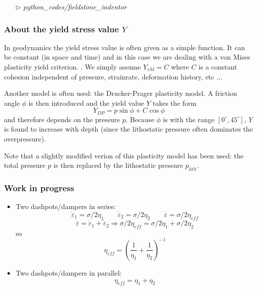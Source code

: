 \begin{mdframed}[backgroundcolor=green!5]
\begin{itemize}
\item[$\triangleright$] {\sl python\_codes/fieldstone\_indentor}
\end{itemize}
\end{mdframed}


\subsubsection{About the yield stress value $Y$}

In geodynamics the yield stress value is often given as a simple function. 
It can be constant (in space and time) and in this case we are dealing with a von Mises plasticity yield criterion. 
. We simply assume $Y_{vM}=C$ where $C$ is a constant cohesion independent of pressure, strainrate,
deformation history, etc ... 

Another model is often used: the Drucker-Prager plasticity model. 
A friction angle $\phi$ is then introduced and the yield value $Y$ takes the form
\[
Y_{DP}=p \sin\phi + C \cos \phi
\]
and therefore depends on the pressure $p$. Because $\phi$ is with the range $[0^\circ,45^\circ]$, $Y$ is
found to increase with depth (since the lithostatic pressure often dominates the overpressure).

Note that a slightly modified verion of this plasticity model has been used: the total pressure $p$
is then replaced by the lithostatic pressure $p_{lith}$.




\subsubsection{Work in progress}

\Literature \cite{zico74,zigo74,zico74b,zien75,corm75,zigo75,zihl75,zijo78,vidm82,vidm84,vede84,zivt85,vimd86}
\cite{wasd97,debo88,debo01,bewv11,mumg10}


\begin{center}
\begin{minipage}[t]{0.5\textwidth}

\end{minipage}
\end{center}
\begin{itemize}
\item Two dashpots/dampers in series: 
\[
\dot{\varepsilon}_1 = \sigma/{2 \eta_1} 
\qquad
\dot{\varepsilon}_2 = \sigma/{2 \eta_2} 
\qquad
\dot{\varepsilon} = \sigma/{2 \eta_{eff}} 
\]
\[
\dot{\varepsilon} = \dot{\varepsilon}_1 + \dot{\varepsilon}_2
\Rightarrow
\sigma/{2 \eta_{eff}} = \sigma/{2 \eta_1} + \sigma/{2 \eta_2} 
\]
so
\[
\eta_{eff} = \left( \frac{1}{\eta_1} + \frac{1}{\eta_2} \right)^{-1}
\]
\item Two dashpots/dampers in parallel: 
\[
\eta_{eff} = \eta_1 + \eta_2
\]
\end{itemize}

